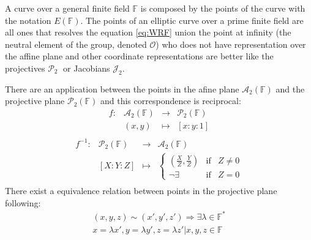 \documentclass[10pt,a4paper,twoside]{llncs}
\newcommand{\Proy}{\ensuremath{\mathcal{P}_{2}}}%
\newcommand{\Jacob}{\ensuremath{\mathcal{J}_{2}}}%
\newcommand{\PaI}{\ensuremath{\mathcal{O}}}%
\begin{document}
A curve over a general finite field $\mathbb{F}$ is composed by the points of the curve with the notation $E\left(\mathbb{F}\right)$. The points of an elliptic curve over a prime finite field are all ones that resolves the equation \ref{eq:WRF} union the point at infinity (the neutral element of the group, denoted \PaI) who does not have representation over the affine plane and other coordinate representations are better like the projectives \Proy $\;$ or Jacobians \Jacob.

\begin{definition}\label{def:afinproy}
 There are an application between the points in the afine plane $\mathcal{A}_{2}\left(\mathbb{F}\right)$ and the projective plane $\mathcal{P}_{2}\left(\mathbb{F}\right)$ and this correspondence is reciprocal:
\begin{equation}
        \begin{array}{cccc}
        f: & \mathcal{A}_{2}\left(\mathbb{F}\right) & \rightarrow & \mathcal{P}_{2}\left(\mathbb{F}\right) \\
        \; & (x,y)                                 & \mapsto     & [x:y:1] \\
        \end{array}
\end{equation}
\begin{equation}
        \begin{array}{cccc}
        f^{-1}: & \mathcal{P}_{2}\left(\mathbb{F}\right) & \rightarrow & \mathcal{A}_{2}\left(\mathbb{F}\right) \\
        \;      & \left[X:Y:Z\right]                    & \mapsto     & \left\{ \begin{array}{ccc}
                                                                                \left(\frac{X}{Z},\frac{Y}{Z}\right) & \text{if} & Z\neq0\\
                                                                                \neg\exists & \text{if} & Z=0
                                                                                \end{array}
                                                                        \right. \\
        \end{array}
\end{equation}
There exist a equivalence relation between points in the projective plane following:
\begin{equation}
        \begin{array}{c}
                \left(x,y,z\right) \sim \left(x',y',z'\right) \Rightarrow \exists\lambda \in \mathbb{F}^{*} \\
                 x=\lambda x', y=\lambda y',z=\lambda z' | x,y,z \in \mathbb{F}
        \end{array}
\end{equation}
\end{definition}
\end{document}
